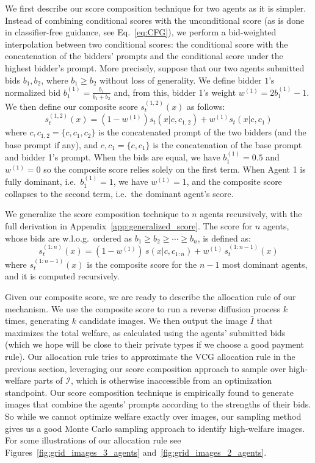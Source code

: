 \documentclass[format=acmsmall, review=false]{acmart}
\begin{document}
We first describe our score composition technique for two agents as it is simpler. Instead of combining conditional scores with the unconditional score (as is done in classifier-free guidance, see Eq.~\eqref{eq:CFG}), we perform a bid-weighted interpolation between two conditional scores: the conditional score with the concatenation of the bidders' prompts and the conditional score under the highest bidder's prompt.  More precisely, suppose that our two agents submitted bids $b_1, b_2$, where $b_1 \ge b_2$ without loss of generality. We define bidder $1$'s normalized bid $b_1^{(1)} = \frac{b_1}{b_1+b_2}$ and, from this, bidder 1's weight $w^{(1)} = 2b_1^{(1)}-1$. We then define our composite score $s_t^{(1,2)}(x)$ as follows:
\begin{equation}
    s^{(1,2)}_t(x) = (1-w^{(1)})s_t(x|c,c_{1,2}) + w^{(1)} s_t(x|c,c_1)
\end{equation}
where $c,c_{1,2} = \{c,c_1, c_2\}$ is the concatenated prompt of the two bidders (and the base prompt if any), and $c,c_1=\{c,c_1\}$ is the concatenation of the base prompt and bidder 1's prompt. When the bids are equal, we have $b_1^{(1)}=0.5$ and $w^{(1)}=0$ so the composite score relies solely on the first term. When Agent 1 is fully dominant, i.e.~$b_1^{(1)}=1$, we have $w^{(1)}=1$, and the composite score collapses to the second term, i.e.~the dominant agent's score.

We generalize the score composition technique to $n$ agents recursively, with the full derivation in Appendix~\ref{app:generalized_score}. The score for $n$ agents, whose bids are w.l.o.g.~ordered as $b_1 \ge b_2 \ge \cdots \ge b_n$, is defined as:
\begin{equation}
s^{(1:n)}_t(x) = (1-w^{(1)}) \, s(x|c, c_{1:n}) + w^{(1)} \, s^{(1:n-1)}_t(x)
\end{equation}
where $s^{(1:n-1)}_t(x)$ is the composite score for the $n-1$ most dominant agents, and it is computed recursively.

Given our composite score, we are ready to describe the allocation rule of our mechanism. We use the composite score to run a reverse diffusion process $k$ times, generating $k$ candidate images. We then output the image $\hat{I}$ that maximizes the total welfare, as calculated using the agents' submitted bids (which we hope will be close to their private types if we choose a good payment rule). Our allocation rule tries to approximate the VCG allocation rule in the previous section, leveraging our score composition approach to sample over high-welfare parts of $\mathcal{I}$, which is otherwise inaccessible from an optimization standpoint. Our score composition technique is empirically found to generate images that combine the agents' prompts according to the strengths of their bids. So while we cannot optimize welfare exactly over images, our sampling method gives us a good Monte Carlo sampling approach to identify high-welfare images. For some illustrations of our allocation rule see Figures~\ref{fig:grid_images_3_agents} and~\ref{fig:grid_images_2_agents}. 
\end{document}
